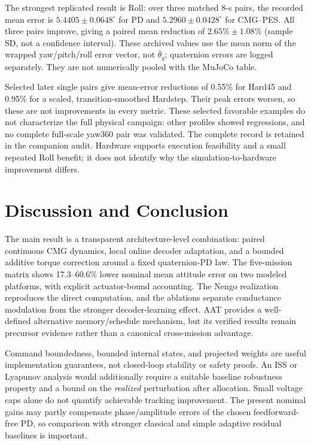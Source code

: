 \documentclass[letterpaper,10pt,conference]{IEEEtran}
\begin{document}
The strongest replicated result is Roll: over three matched 8-s pairs,
the recorded mean error is $5.4405\pm0.0648^\circ$ for PD and
$5.2960\pm0.0428^\circ$ for CMG--PES. All three pairs improve, giving a
paired mean reduction of $2.65\%\pm1.08\%$ (sample SD, not a confidence
interval). These archived values use the mean norm of the wrapped
yaw/pitch/roll error vector, not $\bar\theta_q$; quaternion errors are
logged separately. They are not numerically pooled with the MuJoCo table.

Selected later single pairs give mean-error reductions of 0.55\% for
Hard45 and 0.95\% for a scaled, transition-smoothed Hardstep. Their peak
errors worsen, so these are not improvements in every metric. These
selected favorable examples do not characterize the full physical campaign:
other profiles showed regressions, and no complete full-scale yaw360 pair
was validated. The complete record is retained in the companion audit.
Hardware supports execution feasibility and a small repeated Roll benefit;
it does not identify why the simulation-to-hardware improvement differs.

\section{Discussion and Conclusion}
The main result is a transparent architecture-level combination:
paired continuous CMG dynamics, local online decoder adaptation, and a
bounded additive torque correction around a fixed quaternion-PD law.
The five-mission matrix shows 17.3--60.6\% lower nominal mean attitude
error on two modeled platforms, with explicit actuator-bound accounting.
The Nengo realization reproduces the direct computation, and the ablations
separate conductance modulation from the stronger decoder-learning effect.
AAT provides a well-defined alternative memory/schedule mechanism, but
its verified results remain precursor evidence rather than a canonical
cross-mission advantage.

Command boundedness, bounded internal states, and projected weights are
useful implementation guarantees, not closed-loop stability or safety
proofs. An ISS or Lyapunov analysis would additionally require a suitable
baseline robustness property and a bound on the \emph{realized} perturbation
after allocation. Small voltage caps alone do not quantify achievable
tracking improvement. The present nominal gains may partly compensate
phase/amplitude errors of the chosen feedforward-free PD, so comparison
with stronger classical and simple adaptive residual baselines is important.
\end{document}
